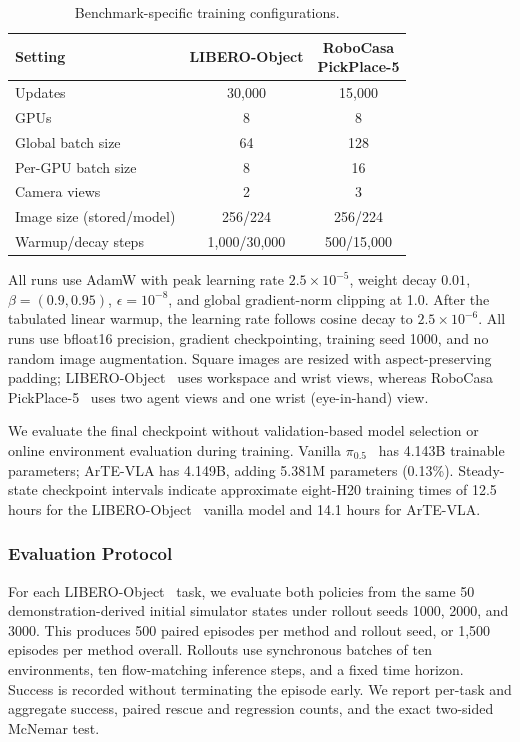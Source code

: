\documentclass[letterpaper,10pt,conference]{ieeeconf}
\newcommand{\method}{ArTE-VLA}
\newcommand{\pihalf}{\ensuremath{\pi_{0.5}}}
\begin{document}
\begin{table}[t]
\caption{Benchmark-specific training configurations.}
\label{tab:training_config}
\centering
\footnotesize
\setlength{\tabcolsep}{3pt}
\begin{tabular}{@{}lcc@{}}
\toprule
Setting & LIBERO-Object & \shortstack{RoboCasa\\PickPlace-5} \\
\midrule
Updates & 30,000 & 15,000 \\
GPUs & 8 & 8 \\
Global batch size & 64 & 128 \\
Per-GPU batch size & 8 & 16 \\
Camera views & 2 & 3 \\
Image size (stored/model) & 256/224 & 256/224 \\
Warmup/decay steps & 1,000/30,000 & 500/15,000 \\
\bottomrule
\end{tabular}
\vspace{-2mm}
\end{table}

All runs use AdamW with peak learning rate $2.5\times10^{-5}$, weight decay $0.01$, $\beta=(0.9,0.95)$, $\epsilon=10^{-8}$, and global gradient-norm clipping at 1.0.
After the tabulated linear warmup, the learning rate follows cosine decay to $2.5\times10^{-6}$.
All runs use bfloat16 precision, gradient checkpointing, training seed 1000, and no random image augmentation.
Square images are resized with aspect-preserving padding; LIBERO-Object~\cite{libero} uses workspace and wrist views, whereas RoboCasa PickPlace-5~\cite{robocasa2024} uses two agent views and one wrist (eye-in-hand) view.

We evaluate the final checkpoint without validation-based model selection or online environment evaluation during training.
Vanilla \pihalf{}~\cite{pi05} has 4.143B trainable parameters; \method{} has 4.149B, adding 5.381M parameters (0.13\%).
Steady-state checkpoint intervals indicate approximate eight-H20 training times of 12.5 hours for the LIBERO-Object~\cite{libero} vanilla model and 14.1 hours for \method{}.

\subsubsection{Evaluation Protocol}

For each LIBERO-Object~\cite{libero} task, we evaluate both policies from the same 50 demonstration-derived initial simulator states under rollout seeds 1000, 2000, and 3000.
This produces 500 paired episodes per method and rollout seed, or 1,500 episodes per method overall.
Rollouts use synchronous batches of ten environments, ten flow-matching inference steps, and a fixed time horizon.
Success is recorded without terminating the episode early.
We report per-task and aggregate success, paired rescue and regression counts, and the exact two-sided McNemar test.
\end{document}
